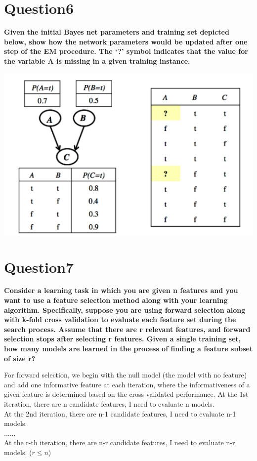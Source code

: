 \documentclass[paper=a4, fontsize=11pt]{scrartcl} %
\numberwithin{equation}{section} %
\numberwithin{figure}{section} %
\numberwithin{table}{section} %
\begin{document}
\section*{Question6}
\textbf{Given the initial Bayes net parameters and training set depicted below, show how the network parameters would be updated after one step of the EM procedure. The `?' symbol indicates that the value for the variable A is missing in a given training instance.}
\begin{center}
	\includegraphics[scale=.5]{pics/hw5_6.png}
\end{center}



\newpage
\section*{Question7}
\textbf{Consider a learning task in which you are given n features and you want to use a feature selection method along with your learning algorithm. Specifically, suppose you are using forward selection along with k-fold cross validation to evaluate each feature set during the search process. Assume that there are r relevant features, and forward selection stops after selecting r features. Given a single training set, how many models are learned in the process of finding a feature subset of size r?}
\bigbreak

For forward selection, we begin with the null model (the model with no feature) and add one informative feature at each iteration, where the informativeness of a given feature is determined based on the cross-validated performance. 
\bigbreak
At the 1st iteration, there are n candidate features, I need to evaluate n models. \\
At the 2nd iteration, there are n-1 candidate features, I need to evaluate n-1 models. \\
......\\
At the r-th iteration, there are n-r candidate features, I need to evaluate n-r models. ($r \leq n$)
\bigbreak
\end{document}
